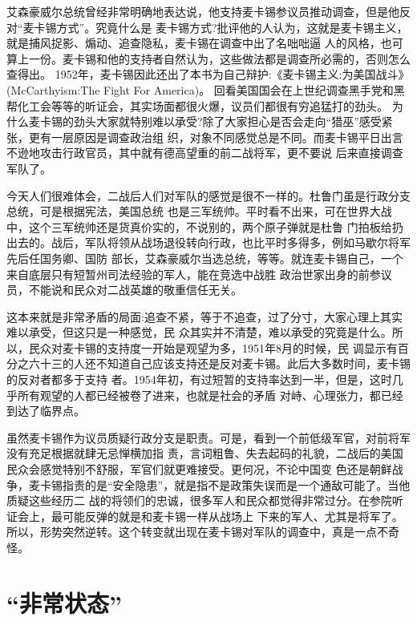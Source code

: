 \documentclass[10pt]{article}
\begin{document}
{艾森豪威尔总统曾经非常明确地表达说，他支持麦卡锡参议员推动调查，但是他反对``麦卡锡方式''。究竟什么是
麦卡锡方式?批评他的人认为，这就是麦卡锡主义，就是捕风捉影、煽动、追查隐私，麦卡锡在调查中出了名咄咄逼
人的风格，也可算上一份。麦卡锡和他的支持者自然认为，这些做法都是调查所必需的，否则怎么查得出。
1952年，麦卡锡因此还出了本书为自己辩护:《麦卡锡主义:为美国战斗》(McCarthyism:The Fight For America)。
回看美国国会在上世纪调查黑手党和黑帮化工会等等的听证会，其实场面都很火爆，议员们都很有穷追猛打的劲头。
为什么麦卡锡的劲头大家就特别难以承受?除了大家担心是否会走向``猎巫''感受紧张，更有一层原因是调查政治组
织，对象不同感觉总是不同。而麦卡锡平日出言不逊地攻击行政官员，其中就有德高望重的前二战将军，更不要说
后来直接调查军队了。

今天人们很难体会，二战后人们对军队的感觉是很不一样的。杜鲁门虽是行政分支总统，可是根据宪法，美国总统
也是三军统帅。平时看不出来，可在世界大战中，这个三军统帅还是货真价实的，不说别的，两个原子弹就是杜鲁
门拍板给扔出去的。战后，军队将领从战场退役转向行政，也比平时多得多，例如马歇尔将军先后任国务卿、国防
部长，艾森豪威尔当选总统，等等。就连麦卡锡自己，一个来自底层只有短暂州司法经验的军人，能在竞选中战胜
政治世家出身的前参议员，不能说和民众对二战英雄的敬重信任无关。

这本来就是非常矛盾的局面:追查不紧，等于不追查，过了分寸，大家心理上其实难以承受，但这只是一种感觉，民
众其实并不清楚，难以承受的究竟是什么。所以，民众对麦卡锡的支持度一开始是观望为多，1951年8月的时候，民
调显示有百分之六十三的人还不知道自己应该支持还是反对麦卡锡。此后大多数时间，麦卡锡的反对者都多于支持
者。1954年初，有过短暂的支持率达到一半，但是，这时几乎所有观望的人都已经被卷了进来，也就是社会的矛盾
对峙、心理张力，都已经到达了临界点。

虽然麦卡锡作为议员质疑行政分支是职责。可是，看到一个前低级军官，对前将军没有充足根据就肆无忌惮横加指
责，言词粗鲁、失去起码的礼貌，二战后的美国民众会感觉特别不舒服，军官们就更难接受。更何况，不论中国变
色还是朝鲜战争，麦卡锡指责的是``安全隐患''，就是指不是政策失误而是一个通敌可能了。当他质疑这些经历二
战的将领们的忠诚，很多军人和民众都觉得非常过分。在参院听证会上，最可能反弹的就是和麦卡锡一样从战场上
下来的军人、尤其是将军了。所以，形势突然逆转。这个转变就出现在麦卡锡对军队的调查中，真是一点不奇怪。

\pagebreak
\section{``非常状态''}

}
\end{document}
